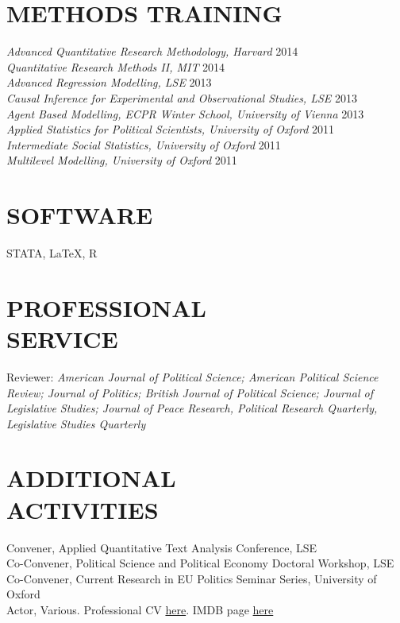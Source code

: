 \documentclass[centered]{res}
\begin{document}
\begin{resume}
\section{METHODS TRAINING}	
{\sl Advanced Quantitative Research Methodology, Harvard} \hfill 2014 \\
{\sl Quantitative Research Methods II, MIT} \hfill 2014 \\
{\sl Advanced Regression Modelling, LSE} \hfill 2013 \\
{\sl Causal Inference for Experimental and Observational Studies, LSE} \hfill 2013 \\
{\sl Agent Based Modelling, ECPR Winter School, University of Vienna} \hfill 2013\\
{\sl Applied Statistics for Political Scientists, University of Oxford} \hfill 2011 \\			
 {\sl Intermediate Social Statistics, University of Oxford} \hfill 2011 \\
{\sl Multilevel Modelling, University of Oxford} \hfill 2011 


\section{SOFTWARE} {} STATA, \LaTeX, R 

\section{PROFESSIONAL \\ SERVICE}  Reviewer: \emph{American Journal of Political Science; American Political Science Review; Journal of Politics; British Journal of Political Science; Journal of Legislative Studies; Journal of Peace Research, Political Research Quarterly, Legislative Studies Quarterly} 
           
\section{ADDITIONAL \\ ACTIVITIES}             
            Convener, Applied Quantitative Text Analysis Conference, LSE \\
            Co-Convener, Political Science and Political Economy Doctoral Workshop, LSE \\
            Co-Convener, Current Research in EU Politics Seminar Series, University of Oxford \\
            Actor, Various. Professional CV \href{http://www.spotlight.com/2219-7831-0442}{here}. IMDB page \href{http://www.imdb.com/name/nm0089773/?ref_=nmbio_bio_nm}{here}
 

\end{resume}
\end{document}
